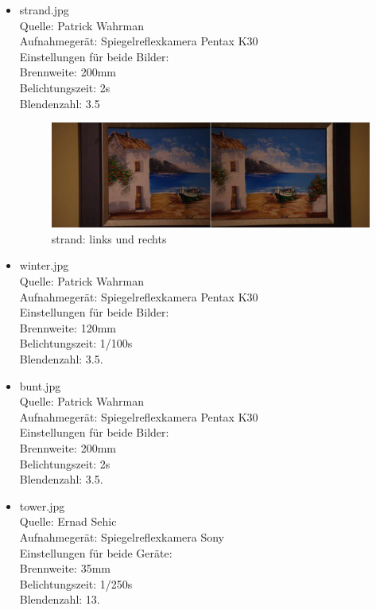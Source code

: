 \documentclass[deutsch]{scrartcl}
\begin{document}
\begin{itemize}
	\item strand.jpg\\
		Quelle: Patrick Wahrman\\
		Aufnahmegerät: Spiegelreflexkamera Pentax K30 \\
		Einstellungen für beide Bilder: \\
		Brennweite: 200mm \\
		Belichtungszeit: 2s \\
		Blendenzahl: 3.5

 	\begin{figure}[h]
\begin{center}
\includegraphics[width=1.0\textwidth]{strand.jpg}
\caption{strand: links und rechts}
\label{fig:strand}
\end{center}
\end{figure}

	\item winter.jpg\\
		Quelle: Patrick Wahrman\\
		Aufnahmegerät: Spiegelreflexkamera Pentax K30 \\
		Einstellungen für beide Bilder: \\
		Brennweite: 120mm \\
		Belichtungszeit: 1/100s \\
		Blendenzahl: 3.5.

	\item bunt.jpg\\
		Quelle: Patrick Wahrman\\
		Aufnahmegerät: Spiegelreflexkamera Pentax K30 \\
		Einstellungen für beide Bilder: \\
		Brennweite: 200mm \\
		Belichtungszeit: 2s\\
		Blendenzahl: 3.5.

	\item tower.jpg\\
		Quelle: Ernad Sehic\\
		Aufnahmegerät: Spiegelreflexkamera Sony \\
		Einstellungen für beide Geräte: \\
		Brennweite: 35mm \\
		Belichtungszeit: 1/250s \\
		Blendenzahl: 13.


\end{itemize}
\end{document}
